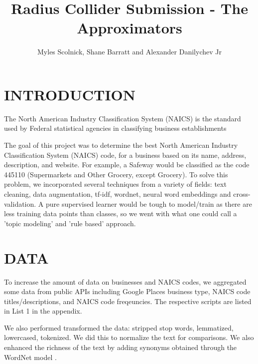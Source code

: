 \documentclass[letterpaper, 9 pt, conference]{IEEEtran}
\title{\LARGE \bf
Radius Collider Submission - The Approximators
}
\author{Myles Scolnick, Shane Barratt and Alexander Danilychev Jr%
}
\begin{document}
\maketitle
\thispagestyle{empty}
\pagestyle{empty}






\section{INTRODUCTION}

The North American Industry Classification System (NAICS) is the standard used by Federal statistical agencies in classifying business establishments 

The goal of this project was to determine the best North American Industry Classification System (NAICS) code, for a business based on its name, address, description, and website. For example, a Safeway would be classified as the code 445110 (Supermarkets and Other Grocery, except Grocery). To solve this problem, we incorporated several techniques from a variety of fields: text cleaning, data augmentation, tf-idf, wordnet, neural word embeddings and cross-validation. A pure supervised learner would be tough to model/train as there are less training data points than classes, so we went with what one could call a 'topic modeling' and 'rule based' approach.

\section{DATA}

To increase the amount of data on businesses and NAICS codes, we aggregated some data from public APIs including Google Places business type, NAICS code titles/descriptions, and NAICS code freqeuncies. The respective scripts are listed in List 1 in the appendix.

We also performed transformed the data: stripped stop words, lemmatized, lowercased, tokenized. We did this to normalize the text for comparisons. We also enhanced the richness of the text by adding synonyms obtained through the WordNet model \cite{wordnet}.
\end{document}
